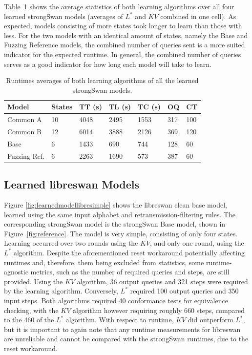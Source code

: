 Table~\ref{tab:runtime_summary_averages} shows the average statistics of both learning algorithms over all four learned strongSwan models (averages of $L^*$ and $KV$ combined in one cell). As expected, models consisting of more states took longer to learn than those with less. For the two models with an identical amount of states, namely the Base and Fuzzing Reference models, the combined number of queries sent is a more suited indicator for the expected runtime. In general, the combined number of queries serves as a good indicator for how long each model will take to learn. \\
\vspace{3mm}
\begin{table}[H]
	\centering
	\begin{tabular}{|l|l|l|l|l|l|l|}
		\hline
		\rowcolor[HTML]{C0C0C0} 
		Model    	& States & TT (s)   & TL (s)   	  & TC (s)   & OQ  & CT  \\ \hline
		Common A  	& 10     & 4048 	  & 2495	 	  & 1553 	 & 317 & 100 \\ \hline
		Common B  	& 12     & 6014 	  & 3888		  & 2126 	 & 369 & 120 \\ \hline
		Base      	& 6      & 1433 	  & 690 		  & 744  	 & 128 & 60  \\ \hline
		Fuzzing Ref.& 6      & 2263 	  & 1690		  & 573  	 & 387 & 60  \\ \hline
	\end{tabular}
	\caption{Runtimes averages of both learning algorithms of all the learned strongSwan models.}
	\label{tab:runtime_summary_averages}
\end{table}
\newpage

\subsection{Learned libreswan Models}
Figure \ref{fig:learnedmodellibresimple} shows the libreswan clean base model, learned using the same input alphabet and retransmission-filtering rules. The corresponding strongSwan model is the strongSwan Base model, shown in Figure~\ref{fig:reference}. The model is very simple, consisting of only four states. Learning occurred over two rounds using the $KV$, and only one round, using the $L^*$ algorithm. Despite the aforementioned reset workaround potentially affecting runtimes and, therefore, them being excluded from statistics, some runtime-agnostic metrics, such as the number of required queries and steps, are still provided. Using the $KV$ algorithm, 36 output queries and 321 steps were required by the learning algorithm. Conversely, $L^*$ required 100 output queries and 350 input steps. Both algorithms required 40 conformance tests for equivalence checking, with the $KV$ algorithm however requiring roughly 660 steps, compared to the 460 of the $L^*$ algorithm. With respect to runtime, $KV$ did outperform $L^*$, but it is important to again note that any runtime measurements for libreswan are unreliable and cannot be compared with the strongSwan runtimes, due to the reset workaround.

